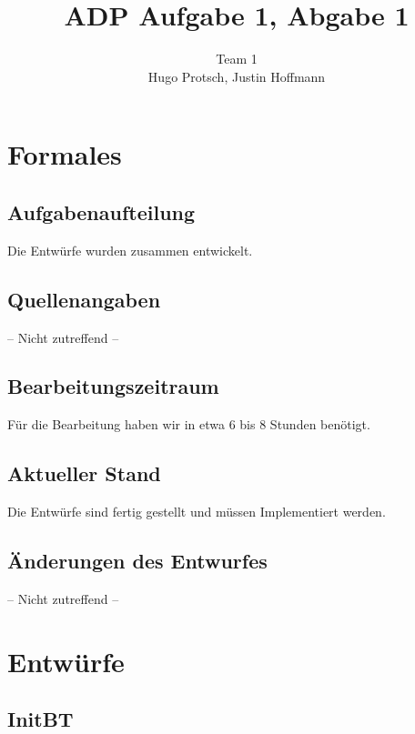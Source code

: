 \documentclass[11pt]{article}
\title{ADP Aufgabe 1, Abgabe 1}
\author{Team 1\\Hugo Protsch, Justin Hoffmann}
\begin{document}
    \maketitle


    \section{Formales}\label{sec:Formales}


    \subsection{Aufgabenaufteilung}
    Die Entwürfe wurden zusammen entwickelt.

    \subsection{Quellenangaben}
    -- Nicht zutreffend --


    \subsection{Bearbeitungszeitraum}
    Für die Bearbeitung haben wir in etwa 6 bis 8 Stunden benötigt.

    \subsection{Aktueller Stand}
    Die Entwürfe sind fertig gestellt und müssen Implementiert werden.


    \subsection{Änderungen des Entwurfes}
    -- Nicht zutreffend --


    \section{Entwürfe}\label{sec:entwürfe}

    \subsection{InitBT}
\end{document}
